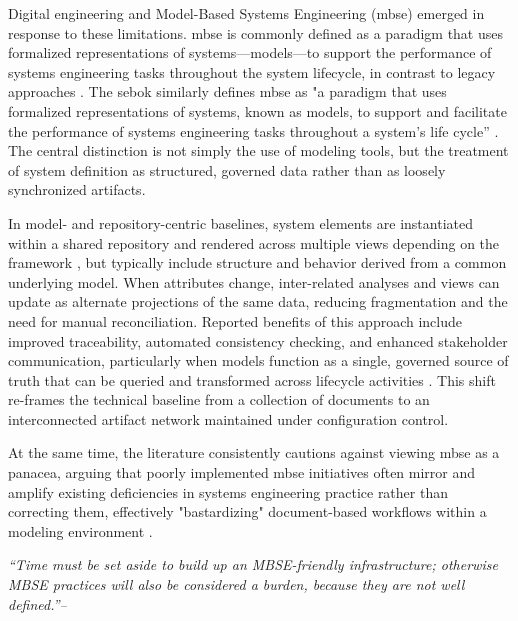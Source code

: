 Digital engineering and Model-Based Systems Engineering (\ac{mbse}) emerged in response to these limitations. \ac{mbse} is commonly defined as a paradigm that uses formalized representations of systems—models—to support the performance of systems engineering tasks throughout the system lifecycle, in contrast to legacy approaches \cite{incose_GuideSystemsEngineering_2025}. The \ac{sebok} similarly defines \ac{mbse} as "a paradigm that uses formalized representations of systems, known as models, to support and facilitate the performance of systems engineering tasks throughout a system’s life cycle'' \cite{incose_GuideSystemsEngineering_2025}. The central distinction is not simply the use of modeling tools, but the treatment of system definition as structured, governed data rather than as loosely synchronized artifacts.

In model- and repository-centric baselines, system elements are instantiated within a shared repository and rendered across multiple views depending on the framework \cite{OMG_UAF_1.3_2025, chiefinformationofficer_DoDAFArchitectureFramework_2010, zachman_ZachmanFrameworkEnterprise_2003}, but typically include structure and behavior derived from a common underlying model. When attributes change, inter-related analyses and views can update as alternate projections of the same data, reducing fragmentation and the need for manual reconciliation. Reported benefits of this approach include improved traceability, automated consistency checking, and enhanced stakeholder communication, particularly when models function as a single, governed source of truth that can be queried and transformed across lifecycle activities \cite{hart_IntroductionModelBasedSystem_2015}. This shift re-frames the technical baseline from a collection of documents to an interconnected artifact network maintained under configuration control.

At the same time, the literature consistently cautions against viewing \ac{mbse} as a panacea, arguing that poorly implemented \ac{mbse} initiatives often mirror and amplify existing deficiencies in systems engineering practice rather than correcting them, effectively "bastardizing" document-based workflows within a modeling environment \cite{lerat_ThreeReasonsWhy_2010, madni_HandbookModelBasedSystems_2023}. 

\vfill
\begin{center}
\itshape
``Time must be set aside to build up an MBSE-friendly infrastructure; otherwise MBSE practices will also be considered a burden, because they are not well defined.''-- \cite{mcdermott_SystemsEngineeringModernization_2003}
\end{center}
\vfill

